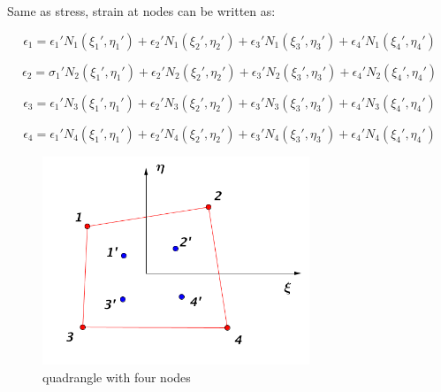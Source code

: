 Same as stress, strain at nodes can be written as:

\begin{equation}
\epsilon_1 = {\epsilon_1}' N_1\left({\xi_1}', {\eta_1}'\right) + {\epsilon_2}' N_1\left({\xi_2}', {\eta_2}'\right) + {\epsilon_3}' N_1\left({\xi_3}', {\eta_3}'\right) + {\epsilon_4}' N_1\left({\xi_4}', {\eta_4}'\right)
\end{equation}

\begin{equation}
\epsilon_2 = {\sigma_1}' N_2\left({\xi_1}', {\eta_1}'\right) + {\epsilon_2}' N_2\left({\xi_2}', {\eta_2}'\right) + {\epsilon_3}' N_2\left({\xi_3}', {\eta_3}'\right) + {\epsilon_4}' N_2\left({\xi_4}', {\eta_4}'\right)
\end{equation}

\begin{equation}
\epsilon_3 = {\epsilon_1}' N_3\left({\xi_1}', {\eta_1}'\right) + {\epsilon_2}' N_3\left({\xi_2}', {\eta_2}'\right) + {\epsilon_3}' N_3\left({\xi_3}', {\eta_3}'\right) + {\epsilon_4}' N_3\left({\xi_4}', {\eta_4}'\right)
\end{equation}

\begin{equation}
\epsilon_4 = {\epsilon_1}' N_4\left({\xi_1}', {\eta_1}'\right) + {\epsilon_2}' N_4\left({\xi_2}', {\eta_2}'\right) + {\epsilon_3}' N_4\left({\xi_3}', {\eta_3}'\right) + {\epsilon_4}' N_4\left({\xi_4}', {\eta_4}'\right)
\end{equation}



\begin{figure}[h]
	\begin{center}
		\includegraphics[width=8cm,clip]{DirectCalculation.pdf}			
		\caption{quadrangle with four nodes}	\label{fig: DirectCalculation}
	\end{center} 
\end{figure}

